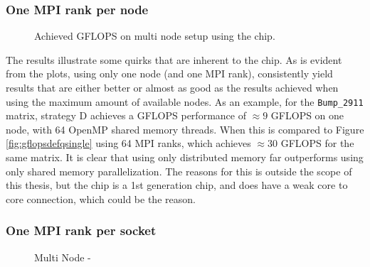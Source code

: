 \subsubsection{One MPI rank per node}
\begin{figure}[htpb]
    \centering
    \caption{Achieved GFLOPS on multi node setup using the  chip.}
    \label{fig:gflopsdefqmulti}
\end{figure}
\medskip

The results illustrate some quirks that are inherent to the  chip. As is evident from the plots, using only one node (and one MPI rank), consistently yield results that are either better or almost as good as the results achieved when using the maximum amount of available nodes. As an example, for the \texttt{Bump\_2911} matrix, strategy D achieves a GFLOPS performance of \(\approx 9\) GFLOPS on one node, with 64 OpenMP shared memory threads. When this is compared to Figure \ref{fig:gflopsdefqsingle} using 64 MPI ranks, which achieves \(\approx 30\) GFLOPS for the same matrix. It is clear that using only distributed memory far outperforms using only shared memory parallelization. The reasons for this is outside the scope of this thesis, but the  chip is a 1st generation chip, and does have a weak core to core connection, which could be the reason. 
\medskip

\begin{figure}[htpb]
    \centering
    \caption{}
    \label{fig:tcommdefqmulti}
\end{figure}


\begin{figure}[htpb]
    \centering
    \caption{}
    \label{}
\end{figure}

\subsubsection{One MPI rank per socket}

\begin{figure}[htpb]
    \centering
    \caption{Multi Node - }
    \label{fig:gflopsdefqmpimulti}
\end{figure}

\begin{figure}[htpb]
    \centering
    \caption{}
    \label{fig:tcommdefqmpimulti}
\end{figure}


\begin{figure}[htpb]
    \centering
    \caption{}
    \label{}
\end{figure}
